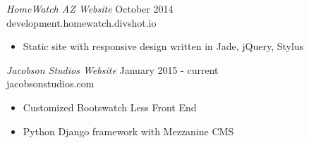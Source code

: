 \documentclass[margin]{res}
\begin{document}
\begin{resume}
  {\sl HomeWatch AZ Website} \hfill October 2014 \\
  development.homewatch.divshot.io
  \begin{itemize}
      \item Static site with responsive design written in Jade, jQuery, Stylus
  \end{itemize} 

  {\sl Jacobson Studios Website} \hfill January 2015 - current \\
  jacobsonstudios.com
  \begin{itemize}
      \item Customized Bootswatch Less Front End
      \item Python Django framework with Mezzanine CMS
  \end{itemize} 



\end{resume}
\end{document}
